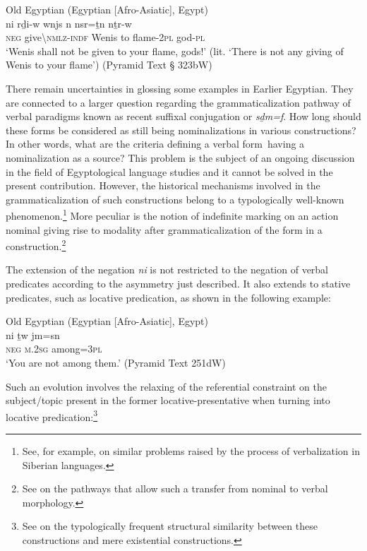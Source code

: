 \documentclass[output=paper,draft,draftmode,colorlinks,citecolor=brown]{langscibook}
\begin{document}
\ea Old Egyptian (Egyptian [Afro-Asiatic], Egypt) \label{ex:AE10}\\ 
	\gll ni rḏi-w wnjs n nsr=ṯn nṯr-w\\
	\textsc{neg} give\textbackslash\textsc{nmlz-indf} Wenis to flame-\textsc{2pl} god-\textsc{pl}\\ 
	\glt ‘Wenis shall not be given to your flame, gods!’ (lit. ‘There is not any giving of Wenis to your flame’) (Pyramid Text § 323bW)
\z 	

There remain uncertainties in glossing some examples in Earlier Egyptian. They are connected to a larger question regarding the grammaticalization pathway of verbal paradigms known as recent suffixal conjugation or \textit{sḏm=f}.
How long should these forms be considered as still being nominalizations in various constructions? In other words, what are the criteria defining a verbal form having a nominalization as a source? This problem is the subject of an ongoing discussion in the field of Egyptological language studies and it cannot be solved in the present contribution. However, the historical mechanisms involved in the grammaticalization of such constructions belong to a typologically well-known phenomenon.\footnote{See, for example, \citet{Malchukov2013} on similar problems raised by the process of verbalization in Siberian languages.} More peculiar is the notion of indefinite marking on an action nominal giving rise to modality after grammaticalization of the form in a construction.\footnote{See \citet{Oreal2017} on the pathways that allow such a transfer from nominal to verbal morphology.}

The extension of the negation \textit{ni} is not restricted to the negation of verbal predicates according to the asymmetry just described. It also extends to stative predicates, such as locative predication, as shown in the following example:

\ea Old Egyptian (Egyptian [Afro-Asiatic], Egypt) \label{ex:AE11}\\
	\gll ni ṯw jm=sn\\
	\textsc{neg} \textsc{m.2sg} among=\textsc{3pl}\\
	\glt ‘You are not among them.’ (Pyramid Text 251dW)
\z 

Such an evolution involves the relaxing of the referential constraint on the subject/topic present in the former locative-presentative when turning into locative predication:\footnote{See \citet[108]{Veselinova2013} on the typologically frequent structural similarity between these constructions and mere existential constructions.}
\end{document}
